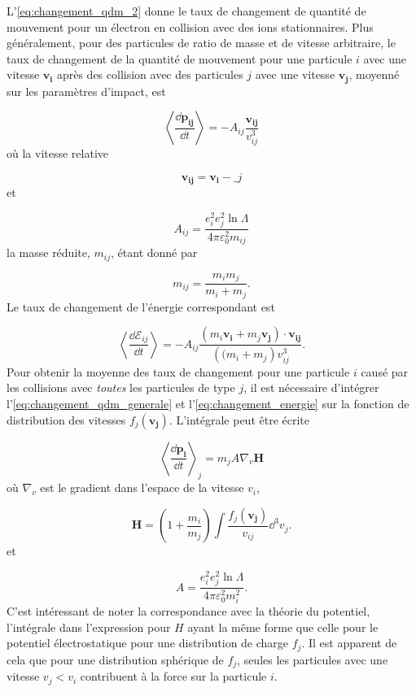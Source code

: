 \documentclass[main.tex]{subfiles}
\begin{document}
L'\autoref{eq:changement_qdm_2} donne le taux de changement de quantité de mouvement pour un électron en collision avec des ions stationnaires.
Plus généralement, pour des particules de ratio de masse et de vitesse arbitraire, le taux de changement de la quantité de mouvement pour une particule \( i \) avec une vitesse \( \bm{v_i} \) après des collision avec des particules \( j \) avec une vitesse \( \bm{v_j} \), moyenné sur les paramètres d'impact, est

\begin{equation}
	\left\langle \frac{\dd \bm{p_{ij}}}{\dd t} \right\rangle = - A_{ij} \frac{\bm{v_{ij}}}{v_{ij}^3}
	\label{eq:changement_qdm_generale}
\end{equation}
où la vitesse relative

\[
	\bm{v_{ij}} = \bm{v_i} - \bm_{j}
\]
et

\[
	A_{ij} = \frac{e_i^2 e_j^2 \ln \Lambda}{4 \pi \varepsilon_0^2 m_{ij}}
\]
la masse réduite, \( m_{ij} \), étant donné par

\[
	m_{ij} = \frac{m_i m_j}{m_i + m_j}.
\]
Le taux de changement de l'énergie correspondant est

\begin{equation}
	\left\langle \frac{\dd \mathscr{E}_{ij}}{\dd t} \right\rangle = - A_{ij} \frac{\left( m_i \bm{v_i} + m_j \bm{v_j} \right) \cdot  \bm{v_{ij}}}{\left(( m_i + m_j \right) v_{ij}^3}.
	\label{eq:changement_energie}
\end{equation}
Pour obtenir la moyenne des taux de changement pour une particule \( i \) causé par les collisions avec \textit{toutes} les particules de type \( j \), il est nécessaire d'intégrer l'\autoref{eq:changement_qdm_generale} et l'\autoref{eq:changement_energie} sur la fonction de distribution des vitesses \( f_j \left( \bm{v_j} \right) \). 
L'intégrale peut être écrite

\begin{equation}
	\left\langle \frac{\dd \bm{p_i}}{\dd t} \right\rangle_j = m_j A \nabla_v \bm{H}
	\label{eq:integrale_fonction_distribution}
\end{equation}
où \( \nabla_v \) est le gradient dans l'espace de la vitesse \( v_i \),

\[
	\bm{H} = \left( 1 + \frac{m_i}{m_j} \right) \int \frac{f_j \left( \bm{v_j} \right)}{v_{ij}} \dd^3 v_j.
\]
et

\[
	A = \frac{e_i^2 e_j^2 \ln \Lambda}{4 \pi \varepsilon_0^2 m_i^2}.
\]
C'est intéressant de noter la correspondance avec la théorie du potentiel, l'intégrale dans l'expression pour \( H \) ayant la même forme que celle pour le potentiel électrostatique pour une distribution de charge \( f_j \).
Il est apparent de cela que pour une distribution sphérique de \( f_j \), seules les particules avec une vitesse \( v_j < v_i \) contribuent à la force sur la particule \( i \).
\end{document}
